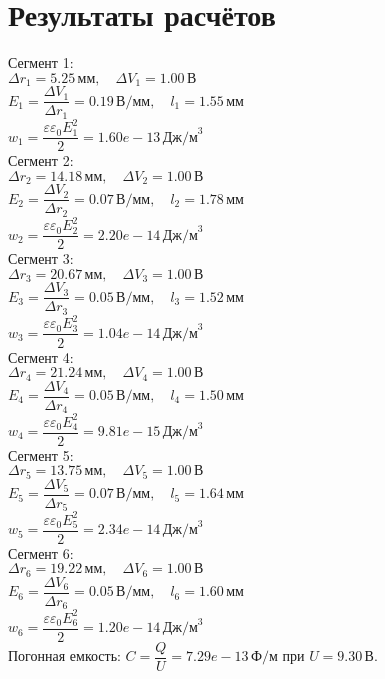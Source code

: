 \documentclass{article}
\begin{document}
\section*{Результаты расчётов}
\noindent Сегмент 1:\\
$\Delta r_{1} = 5.25\,\text{мм},\quad \Delta V_{1} = 1.00\,\text{В}$\\
$E_{1} = \dfrac{\Delta V_{1}}{\Delta r_{1}} = 0.19\,\text{В/мм},\quad l_{1} = 1.55\,\text{мм}$\\
$w_{1} = \dfrac{\varepsilon\varepsilon_0E_{1}^2}2 = 1.60e-13\,\text{Дж/м}^3$\\[1em]
\noindent Сегмент 2:\\
$\Delta r_{2} = 14.18\,\text{мм},\quad \Delta V_{2} = 1.00\,\text{В}$\\
$E_{2} = \dfrac{\Delta V_{2}}{\Delta r_{2}} = 0.07\,\text{В/мм},\quad l_{2} = 1.78\,\text{мм}$\\
$w_{2} = \dfrac{\varepsilon\varepsilon_0E_{2}^2}2 = 2.20e-14\,\text{Дж/м}^3$\\[1em]
\noindent Сегмент 3:\\
$\Delta r_{3} = 20.67\,\text{мм},\quad \Delta V_{3} = 1.00\,\text{В}$\\
$E_{3} = \dfrac{\Delta V_{3}}{\Delta r_{3}} = 0.05\,\text{В/мм},\quad l_{3} = 1.52\,\text{мм}$\\
$w_{3} = \dfrac{\varepsilon\varepsilon_0E_{3}^2}2 = 1.04e-14\,\text{Дж/м}^3$\\[1em]
\noindent Сегмент 4:\\
$\Delta r_{4} = 21.24\,\text{мм},\quad \Delta V_{4} = 1.00\,\text{В}$\\
$E_{4} = \dfrac{\Delta V_{4}}{\Delta r_{4}} = 0.05\,\text{В/мм},\quad l_{4} = 1.50\,\text{мм}$\\
$w_{4} = \dfrac{\varepsilon\varepsilon_0E_{4}^2}2 = 9.81e-15\,\text{Дж/м}^3$\\[1em]
\noindent Сегмент 5:\\
$\Delta r_{5} = 13.75\,\text{мм},\quad \Delta V_{5} = 1.00\,\text{В}$\\
$E_{5} = \dfrac{\Delta V_{5}}{\Delta r_{5}} = 0.07\,\text{В/мм},\quad l_{5} = 1.64\,\text{мм}$\\
$w_{5} = \dfrac{\varepsilon\varepsilon_0E_{5}^2}2 = 2.34e-14\,\text{Дж/м}^3$\\[1em]
\noindent Сегмент 6:\\
$\Delta r_{6} = 19.22\,\text{мм},\quad \Delta V_{6} = 1.00\,\text{В}$\\
$E_{6} = \dfrac{\Delta V_{6}}{\Delta r_{6}} = 0.05\,\text{В/мм},\quad l_{6} = 1.60\,\text{мм}$\\
$w_{6} = \dfrac{\varepsilon\varepsilon_0E_{6}^2}2 = 1.20e-14\,\text{Дж/м}^3$\\[1em]
\vspace{1em}
\noindent Погонная емкость: $C = \dfrac{Q}{U} = 7.29e-13\,\text{Ф/м}$ при $U = 9.30\,\text{В}$.
\end{document}
